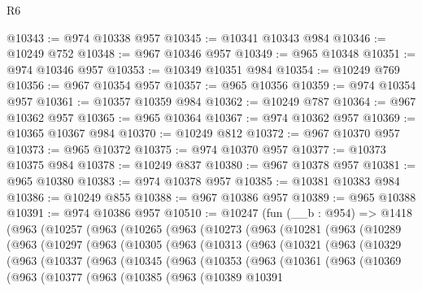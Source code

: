 \begin{lexlean}{R6}
\begin{coremodule}
@10343 := @974 @10338 @957
@10345 := @10341 @10343 @984
@10346 := @10249 @752
@10348 := @967 @10346 @957
@10349 := @965 @10348
@10351 := @974 @10346 @957
@10353 := @10349 @10351 @984
@10354 := @10249 @769
@10356 := @967 @10354 @957
@10357 := @965 @10356
@10359 := @974 @10354 @957
@10361 := @10357 @10359 @984
@10362 := @10249 @787
@10364 := @967 @10362 @957
@10365 := @965 @10364
@10367 := @974 @10362 @957
@10369 := @10365 @10367 @984
@10370 := @10249 @812
@10372 := @967 @10370 @957
@10373 := @965 @10372
@10375 := @974 @10370 @957
@10377 := @10373 @10375 @984
@10378 := @10249 @837
@10380 := @967 @10378 @957
@10381 := @965 @10380
@10383 := @974 @10378 @957
@10385 := @10381 @10383 @984
@10386 := @10249 @855
@10388 := @967 @10386 @957
@10389 := @965 @10388
@10391 := @974 @10386 @957
@10510 := @10247
    (fun (__b : @954) =>
    @1418
      (@963
        (@10257
          (@963
            (@10265
              (@963
                (@10273
                  (@963
                    (@10281
                      (@963
                        (@10289
                          (@963
                            (@10297
                              (@963
                                (@10305
                                  (@963
                                    (@10313
                                      (@963
                                        (@10321
                                          (@963
                                            (@10329
                                              (@963
                                                (@10337
                                                  (@963
                                                    (@10345
                                                      (@963
                                                        (@10353
                                                          (@963
                                                            (@10361
                                                              (@963
                                                                (@10369
                                                                  (@963
                                                                    (@10377
                                                                      (@963
                                                                        (@10385
                                                                          (@963
                                                                            (@10389
                                                                              @10391

\end{coremodule}
\end{lexlean}
